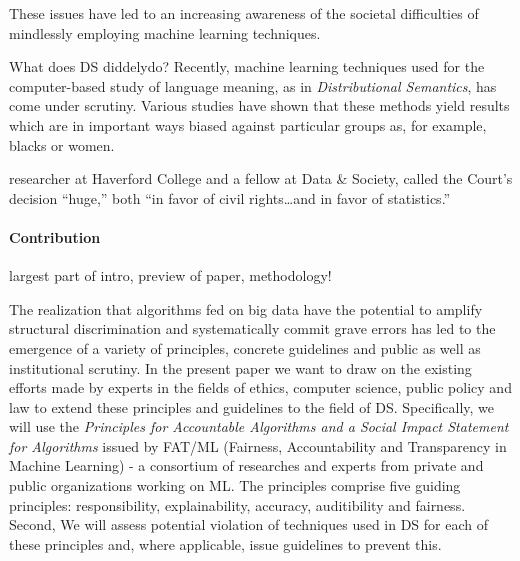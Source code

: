 \documentclass{article}
\begin{document}
These issues have led to an increasing awareness of the societal difficulties of mindlessly employing machine learning techniques. 

What does DS diddelydo?
Recently, machine learning techniques used for the computer-based study of language meaning, as in \emph{Distributional Semantics}, has come under scrutiny.
Various studies have shown that these methods yield results which are in important ways biased against particular groups as, for example, blacks or women.

researcher at Haverford College and a fellow at Data \& Society, called the Court’s decision “huge,” both “in favor of civil rights…and in favor of statistics.”

\paragraph{Contribution}
largest part of intro, preview of paper, methodology!

The realization that algorithms fed on big data have the potential to amplify structural discrimination and systematically commit grave errors has led to the emergence of a variety of principles, concrete guidelines and public as well as institutional scrutiny.
In the present paper we want to draw on the existing efforts made by experts in the fields of ethics, computer science, public policy and law to extend these principles and guidelines to the field of DS. Specifically, we will use the \emph{Principles for Accountable Algorithms and a Social Impact Statement for Algorithms} issued by FAT/ML (Fairness, Accountability and Transparency in Machine Learning) - a consortium of researches and experts from private and public organizations working on ML. 
The principles comprise five guiding principles: responsibility, explainability, accuracy, auditibility and fairness. %
Second, 
We will assess potential violation of techniques used in DS for each of these principles and, where applicable, issue guidelines to prevent this.
\end{document}
